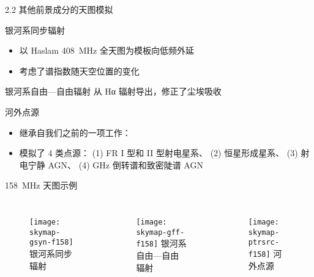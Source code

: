 \documentclass{beamer}
\begin{document}
\begin{frame}{2.2 其他前景成分的天图模拟}
  \begin{alertblock}{银河系同步辐射}
    \begin{itemize}
      \item 以 Haslam \SI{408}{\MHz} 全天图为模板向低频外延
      \item 考虑了谱指数随天空位置的变化
    \end{itemize}
  \end{alertblock}

  \begin{alertblock}{银河系自由—自由辐射}
    \vspace{1ex}
    从 Hα 辐射导出，修正了尘埃吸收
  \end{alertblock}

  \begin{alertblock}{河外点源}
    \begin{itemize}
      \item 继承自我们之前的一项工作：\cite{wang2010}
      \item 模拟了 4 类点源：
        (1) FR I 型和 II 型射电星系、
        (2) 恒星形成星系、
        (3) 射电宁静 AGN、
        (4) GHz 倒转谱和致密陡谱 AGN
    \end{itemize}
  \end{alertblock}
\end{frame}

\begin{frame}[c]
  \begin{alertblock}{\SI{158}{\MHz} 天图示例}
  \end{alertblock}
  \begin{columns}
    \begin{figure}
      \centering\footnotesize
      \texttt{[image: skymap-gsyn-f158]}
      银河系同步辐射
    \end{figure}

    \begin{figure}
      \centering\footnotesize
      \texttt{[image: skymap-gff-f158]}
      银河系自由—自由辐射
    \end{figure}

    \begin{figure}
      \centering\footnotesize
      \texttt{[image: skymap-ptrsrc-f158]}
      河外点源
    \end{figure}
  \end{columns}
\end{frame}
\end{document}
